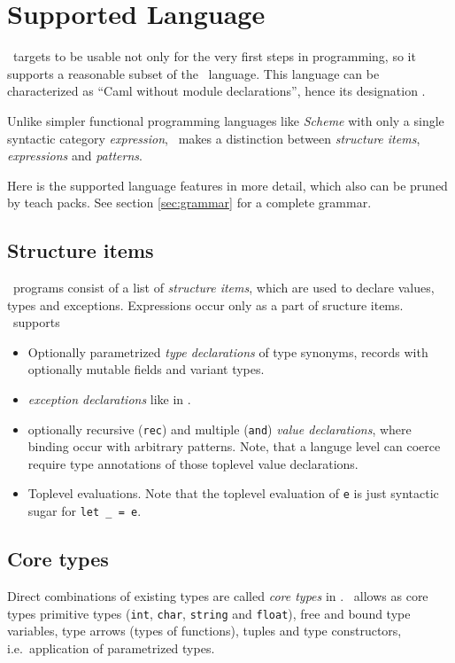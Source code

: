 
\section{Supported Language}
\label{sec:language}

\easyocaml\ targets to be usable not only for the very first steps in
programming, so it supports a reasonable subset of the \ocaml\ language.
This language can be characterized as ``Caml without module declarations'',
hence its designation \camlm.

Unlike simpler functional programming languages like \textit{Scheme} with only a single
syntactic category \emph{expression}, \ocaml\ makes a distinction between 
\emph{structure items}, \emph{expressions} and \emph{patterns}.

Here is the supported language features in more detail, which also can be
pruned by teach packs. See section \ref{sec:grammar} for a complete grammar.


\subsection*{Structure items}

\ocaml\ programs consist of a list of \emph{structure items}, which are used to
declare values, types and exceptions. Expressions occur only as a part of
sructure items. \easyocaml\ supports
\begin{itemize}
  \item Optionally parametrized \emph{type declarations} of type synonyms,
    records with optionally mutable fields and variant types.
  \item \emph{exception declarations} like in \ocaml.
  \item optionally recursive (\texttt{rec}) and multiple (\texttt{and})
    \emph{value declarations}, where binding occur with arbitrary patterns.
    Note, that a languge level can coerce require type annotations of those
    toplevel value declarations.
  \item Toplevel evaluations. Note that the toplevel evaluation of \texttt{e} is just
    syntactic sugar for \texttt{let \_ = e}.
\end{itemize}

\subsection*{Core types}
Direct combinations of existing types are called \emph{core types} in \ocaml.
\easyocaml\ allows as core types primitive types (\texttt{int}, \texttt{char},
\texttt{string} and \texttt{float}), free and bound type variables, type arrows
(types of functions), tuples and type constructors, i.e.\ application of
parametrized types.

